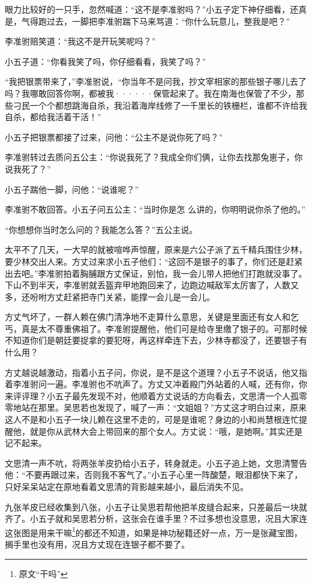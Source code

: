 眼力比较好的一只手，忽然喊道：“这不是李准驸吗？”小五子定下神仔细看，还真是，气得跑过去，一脚把李准驸踹下马来骂道：“你什么玩意儿，整我是吧？”

李准驸赔笑道：“我这不是开玩笑呢吗？”

小五子道：“你看我笑了吗，你仔细看看，我笑了吗？”

“我把银票带来了，”李准驸说，“你当年不是问我，抄文宰相家的那些银子哪儿去了吗？我哪敢回答你啊，都被我······保管起来了。我在南海也保管了不少，那些刁民一个个都想跳海自杀，我沿着海岸线修了一千里长的铁栅栏，谁都不许给我自杀，都给我活着干活！”

小五子把银票都接了过来，问他：“公主不是说你死了吗？”

李准驸转过去质问五公主：“你说我死了？我成全你们俩，让你去找那兔崽子，你说我死了？”

小五子踹他一脚，问他：“说谁呢？”

李准驸不敢回答。小五子问五公主：“当时你是怎
么讲的，你明明说你杀了他的。”

“你想想你当时怎么问的？我能怎么答？”五公主说。
\newline

太平不了几天，一大早的就被喧哗声惊醒，原来是六公子派了五千精兵围住少林，要少林交出人来。方丈过来求小五子他们：“这回不是银子的事了，你们还是赶紧出去吧。”李准驸拍着胸脯跟方丈保证，别怕，我一会儿带人把他们打跑就没事了。下山不到半天，李准驸就丢盔弃甲地跑回来了，边跑边喊敌军太厉害了，人数又多，还吩咐方丈赶紧把寺门关紧，能撑一会儿是一会儿。

方丈气坏了，一群人赖在佛门清净地不走算什么意思，关键是里面还有女人和乞丐，真是太不尊重佛祖了。李准驸提醒他，他们可是给寺里缴了银子的。可那时候不知道你们是朝廷要捉拿的要犯呀，再这样牵连下去，少林寺都没了，还要银子有什么用？

方丈越说越激动，指着小五子问，你说，是不是这个道理？小五子不说话，他又指着李准驸问一遍。李准驸也不吭声了。方丈又冲着殿门外站着的人喊，还有你，你来评评理？小五子最先发现不对，他顺着方丈说话的方向看去，文思清一个人孤零零地站在那里。吴思若也发现了，喊了一声：“文姐姐？”方丈这才明白过来，原来这人不是和小五子一块儿赖在这里不走的，可是是谁呢？身边的小和尚慧根连忙提醒他，就是你从武林大会上带回来的那个女人。方丈说：“哦，是她啊。”其实还是记不起来。

文思清一声不吭，将两张羊皮扔给小五子，转身就走。小五子追上她，文思清警告他：“不要再跟过来，否则我不客气了。”小五子心里一阵酸楚，眼泪都快下来了，只好呆呆站定在原地看着文思清的背影越来越小，最后消失不见。

九张羊皮已经收集到八张，小五子让吴思若帮他把羊皮缝合起来，只差最后一块就齐了。小五子就和吴思若分析，这张会在谁手里？不过多想也没意思，况且大家连这张图是用来干嘛\footnote{原文“干吗”}的都还不知道，如果是神功秘籍还好一点，万一是张藏宝图，搁手里也没有用，况且方丈现在连银子都不要了。

